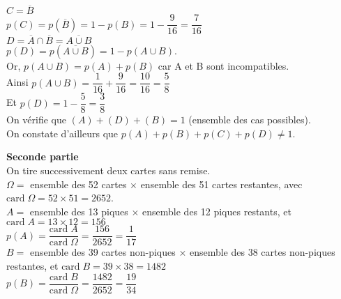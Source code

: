 $ C = \overline{B} $ \\

$ p\left(C\right) = p\left(\overline{B} \right) = 1 - p\left(B\right) = 1 - \dfrac{9}{16} = \dfrac{7}{16} $ \\

$ D = \overline{A} \cap \overline{B} = \overline{A \cup B} $ \\

$ p\left(D\right) = p\left(\overline{A\cup B}\right) = 1 - p\left(A\cup B\right)$.  \\

Or, $p\left(A\cup B\right) = p\left(A\right) + p\left(B\right) $ car A et B sont incompatibles. \\

Ainsi $p\left(A\cup B\right) = \dfrac{1}{16} + \dfrac{9}{16} = \dfrac{10}{16} = \dfrac{5}{8} $ \\

Et $p\left(D\right) = 1 - \dfrac{5}{8} = \dfrac{3}{8} $ \\

On vérifie que $\left(A\right) + \left(D\right) + \left(B\right) = 1$ (ensemble des cas possibles). \\ On constate d'ailleurs que $p\left(A\right) + p\left(B\right) + p\left(C\right) + p\left(D\right) \neq 1 $.

\newpage

\textbf{Seconde partie} \\

On tire successivement deux cartes sans remise. \\

$\Omega =$  ensemble des 52 cartes $ \times $ ensemble des 51 cartes restantes, avec $\mathrm{card} \; \Omega = 52 \times 51 = 2652 $. \\

$ A = $ ensemble des 13 piques $ \times $ ensemble des 12 piques restants, et $\mathrm{card} \; A = 13 \times 12 = 156 $ \\

$ p\left(A\right) = \dfrac{\mathrm{card} \; A}{\mathrm{card} \; \Omega} = \dfrac{156}{2652} = \dfrac{1}{17} $ \\

$ B = $ ensemble des 39 cartes non-piques $ \times $ ensemble des 38 cartes non-piques restantes, et $\mathrm{card} \; B = 39 \times 38 = 1482 $ \\

$ p\left(B\right) = \dfrac{\mathrm{card} \; B}{\mathrm{card} \; \Omega} = \dfrac{1482}{2652} = \dfrac{19}{34} $ \\

